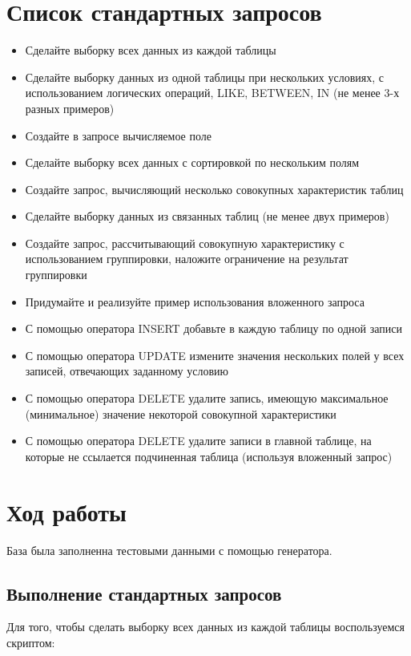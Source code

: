 \documentclass[a4paper,14pt]{extarticle}
\begin{document}
\section{Список стандартных запросов}
\begin{itemize}
\item Сделайте выборку всех данных из каждой таблицы
\item Сделайте выборку данных из одной таблицы при нескольких условиях, с использованием логических операций, LIKE, BETWEEN, IN (не менее 3-х разных примеров)
\item Создайте в запросе вычисляемое поле
\item Сделайте выборку всех данных с сортировкой по нескольким полям
\item Создайте запрос, вычисляющий несколько совокупных характеристик таблиц
\item Сделайте выборку данных из связанных таблиц (не менее двух примеров)
\item Создайте запрос, рассчитывающий совокупную характеристику с использованием группировки, наложите ограничение на результат группировки
\item Придумайте и реализуйте пример использования вложенного запроса
\item С помощью оператора INSERT добавьте в каждую таблицу по одной записи
\item С помощью оператора UPDATE измените значения нескольких полей у всех записей, отвечающих заданному условию
\item С помощью оператора DELETE удалите запись, имеющую максимальное (минимальное) значение некоторой совокупной характеристики
\item С помощью оператора DELETE удалите записи в главной таблице, на которые не ссылается подчиненная таблица (используя вложенный запрос)
\end{itemize}

\section{Ход работы}

База была заполненна тестовыми данными с помощью генератора.

\subsection{Выполнение стандартных запросов}

Для того, чтобы сделать выборку всех данных из каждой таблицы воспользуемся скриптом:

\end{document}
